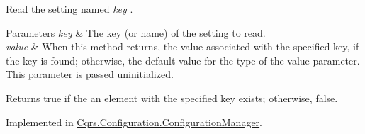 Read the setting named {\itshape key} . 


\begin{DoxyParams}{Parameters}
{\em key} & The key (or name) of the setting to read.\\
\hline
{\em value} & When this method returns, the value associated with the specified key, if the key is found; otherwise, the default value for the type of the value parameter. This parameter is passed uninitialized.\\
\hline
\end{DoxyParams}
\begin{DoxyReturn}{Returns}
true if the an element with the specified key exists; otherwise, false.
\end{DoxyReturn}


Implemented in \hyperlink{classCqrs_1_1Configuration_1_1ConfigurationManager_a40810d0b9fd2f3d1c4a270681e908c84_a40810d0b9fd2f3d1c4a270681e908c84}{Cqrs.\+Configuration.\+Configuration\+Manager}.

